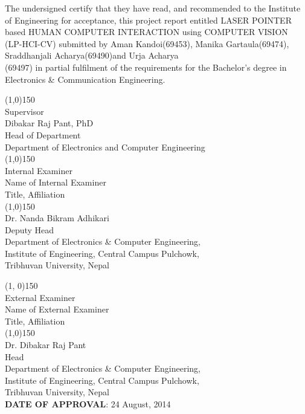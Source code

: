 \vspace{0.5cm}
        The undersigned certify that they have read, and recommended to the Institute of Engineering for acceptance, this project report entitled LASER POINTER based HUMAN­ COMPUTER INTERACTION using COMPUTER VISION (LP-­HCI-­CV) submitted by Aman Kandoi(69453), Manika Gartaula(69474), Sraddhanjali Acharya(69490)and Urja Acharya \\(69497) in partial fulfilment of the requirements for the Bachelor's degree in Electronics \& Communication Engineering.

		\vspace{0.5cm}
		\begin{flushleft}
		
        \line(1,0){150}\\
		Supervisor\\
    	Dibakar Raj Pant, PhD\\
		Head of Department\\
		Department of Electronics and Computer Engineering\\
		
		\line(1,0){150}\\
		Internal Examiner\\
		Name of Internal Examiner\\
		Title, Affiliation\\	
		
		\line(1,0){150}\\
		Dr. Nanda Bikram Adhikari\\
		Deputy Head\\
		Department of Electronics \& Computer Engineering,\\
		Institute of Engineering, Central Campus Pulchowk,\\
		Tribhuvan University, Nepal
		
		\line(1, 0){150}\\
		External Examiner\\
		Name of External Examiner\\
		Title, Affiliation\\
		
		\line(1,0){150}\\
		Dr. Dibakar Raj Pant\\
		Head\\
		Department of Electronics \& Computer Engineering,\\
		Institute of Engineering, Central Campus Pulchowk,\\
		Tribhuvan University, Nepal\\
    	\vspace{0.5cm}
		\textbf{DATE OF APPROVAL}: 24 August, 2014    
		\end{flushleft}
